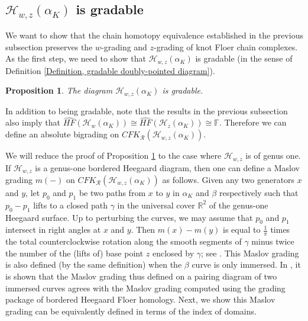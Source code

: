 \documentclass{amsart}
\newtheorem{prop}[thm]{Proposition}
\theoremstyle{definition}
\theoremstyle{remark}
\numberwithin{equation}{section}
\numberwithin{equation}{section} \makeatletter
\begin{document}
\subsection{$\mathcal{H}_{w,z}(\alpha_{K})$ is gradable}
We want to show that the chain homotopy equivalence established in the previous subsection preserves the $w$-grading and $z$-grading of knot Floer chain complexes. As the first step, we need to show that $\mathcal{H}_{w,z}(\alpha_{K})$ is gradable (in the sense of Definition \ref{Definition, gradable doubly-pointed diagram}).






\begin{prop}\label{Proposition, Maslov index of periodic domain}
The diagram $\mathcal{H}_{w,z}(\alpha_{K})$ is gradable.
\end{prop}
\noindent In addition to being gradable, note that the results in the previous subsection also imply that $\widehat{HF}(\mathcal{H}_{w}(\alpha_{K}))\cong \widehat{HF}(\mathcal{H}_{z}(\alpha_{K}))\cong \mathbb{F}$. Therefore we can define an absolute bigrading on $CFK_{\mathcal{R}}(\mathcal{H}_{w,z}(\alpha_{K}))$.







We will reduce the proof of Proposition \ref{Proposition, Maslov index of periodic domain} to the case where $\mathcal{H}_{w,z}$ is of genus one. If $\mathcal{H}_{w,z}$ is a genus-one bordered Heegaard diagram, then one can define a Maslov grading $m(-)$ on $CFK_{\mathcal{R}}(\mathcal{H}_{w,z}(\alpha_{K}))$ as follows. Given any two generators $x$ and $y$, let $p_0$ and $p_1$ be two paths from $x$ to $y$ in $\alpha_K$ and $\beta$ respectively such that $p_0-p_1$ lifts to a closed path $\gamma$ in the universal cover $\mathbb{R}^2$ of the genus-one Heegaard surface. Up to perturbing the curves, we may assume that $p_0$ and $p_1$ intersect in right angles at $x$ and $y$. Then $m(x)-m(y)$ is equal to $\frac{1}{\pi}$ times the total counterclockwise rotation along the smooth segments of $\gamma$ minus twice the number of the (lifts of) base point $z$ enclosed by $\gamma$; see \cite[Definition 35]{Hanselman2022}. This Maslov grading is also defined (by the same definition) when the $\beta$ curve is only immersed. In \cite{Hanselman2022}, it is shown that the Maslov grading thus defined on a pairing diagram of two immersed curves agrees with the Maslov grading computed using the grading package of bordered Heegaard Floer homology. Next, we show this Maslov grading can be equivalently defined in terms of the index of domains. 
\end{document}
